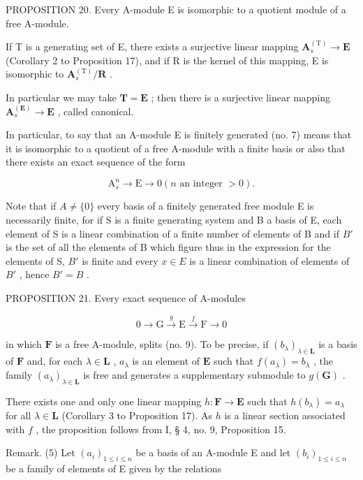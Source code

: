 PROPOSITION 20. Every A-module E is isomorphic to a quotient module of a free A-module.

If T is a generating set of E, there exists a surjective linear mapping \(\mathbf{A}_{s}^{(\mathrm{T})}\to\mathbf{E}\) (Corollary 2 to Proposition 17), and if R is the kernel of this mapping, E is isomorphic to \(\mathbf{A}_{s}^{(\mathrm{T})}/\mathbf{R}\) .

In particular we may take \(\mathbf{T} = \mathbf{E}\) ; then there is a surjective linear mapping \(\mathbf{A}_s^{(\mathbf{E})} \to \mathbf{E}\) , called canonical.

In particular, to say that an A-module E is finitely generated (no. 7) means that it is isomorphic to a quotient of a free A-module with a finite basis or also that there exists an exact sequence of the form

\[
\mathrm{A} _ {s} ^ {n} \rightarrow \mathrm{E} \rightarrow 0 (n \text {   an   integer   } > 0).
\]

Note that if \(A \neq \{0\}\) every basis of a finitely generated free module E is necessarily finite, for if S is a finite generating system and B a basis of E, each element of S is a linear combination of a finite number of elements of B and if \(B'\) is the set of all the elements of B which figure thus in the expression for the elements of S, \(B'\) is finite and every \(x \in E\) is a linear combination of elements of \(B'\) , hence \(B' = B\) .

PROPOSITION 21. Every exact sequence of A-modules

\[
0 \longrightarrow \mathrm{G} \stackrel {g} {\longrightarrow} \mathrm{E} \stackrel {f} {\longrightarrow} \mathrm{F} \longrightarrow 0
\]

in which \(\mathbf{F}\) is a free A-module, splits (no. 9). To be precise, if \((b_{\lambda})_{\lambda \in \mathbf{L}}\) is a basis of \(\mathbf{F}\) and, for each \(\lambda \in \mathbf{L}\) , \(a_{\lambda}\) is an element of \(\mathbf{E}\) such that \(f(a_{\lambda}) = b_{\lambda}\) , the family \((a_{\lambda})_{\lambda \in \mathbf{L}}\) is free and generates a supplementary submodule to \(g(\mathbf{G})\) .

There exists one and only one linear mapping \(h: \mathbf{F} \to \mathbf{E}\) such that \(h(b_{\lambda}) = a_{\lambda}\) for all \(\lambda \in \mathbf{L}\) (Corollary 3 to Proposition 17). As \(h\) is a linear section associated with \(f\) , the proposition follows from I, § 4, no. 9, Proposition 15.

Remark. (5) Let \((a_{i})_{1\leqslant i\leqslant n}\) be a basis of an A-module E and let \((b_{i})_{1\leqslant i\leqslant n}\) be a family of elements of E given by the relations

